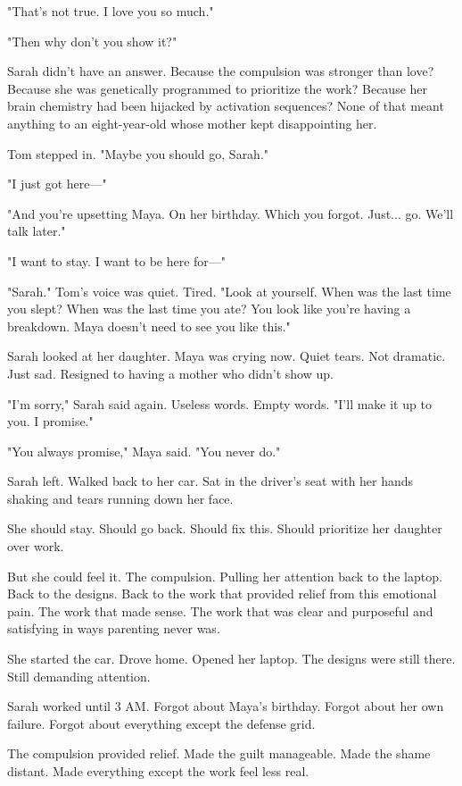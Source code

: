 "That's not true. I love you so much."

"Then why don't you show it?"

Sarah didn't have an answer. Because the compulsion was stronger than love? Because she was genetically programmed to prioritize the work? Because her brain chemistry had been hijacked by activation sequences? None of that meant anything to an eight-year-old whose mother kept disappointing her.

Tom stepped in. "Maybe you should go, Sarah."

"I just got here—"

"And you're upsetting Maya. On her birthday. Which you forgot. Just... go. We'll talk later."

"I want to stay. I want to be here for—"

"Sarah." Tom's voice was quiet. Tired. "Look at yourself. When was the last time you slept? When was the last time you ate? You look like you're having a breakdown. Maya doesn't need to see you like this."

Sarah looked at her daughter. Maya was crying now. Quiet tears. Not dramatic. Just sad. Resigned to having a mother who didn't show up.

"I'm sorry," Sarah said again. Useless words. Empty words. "I'll make it up to you. I promise."

"You always promise," Maya said. "You never do."

Sarah left. Walked back to her car. Sat in the driver's seat with her hands shaking and tears running down her face.

She should stay. Should go back. Should fix this. Should prioritize her daughter over work.

But she could feel it. The compulsion. Pulling her attention back to the laptop. Back to the designs. Back to the work that provided relief from this emotional pain. The work that made sense. The work that was clear and purposeful and satisfying in ways parenting never was.

She started the car. Drove home. Opened her laptop. The designs were still there. Still demanding attention.

Sarah worked until 3 AM. Forgot about Maya's birthday. Forgot about her own failure. Forgot about everything except the defense grid.

The compulsion provided relief. Made the guilt manageable. Made the shame distant. Made everything except the work feel less real.

